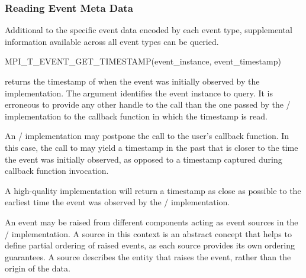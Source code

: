 \subsubsection{Reading Event Meta Data}
\label{sec:tools:mpit:events:metadata}

Additional to the specific event data encoded by each event type,
supplemental information available across all event types can be queried.

\begin{funcdef}{MPI\_T\_EVENT\_GET\_TIMESTAMP}{(\mbox{event\_instance}, \mbox{event\_timestamp})}
\end{funcdef}

 returns the timestamp of when the
event was initially observed by the implementation.  The
 argument identifies the event instance to
query. It is erroneous to provide any other handle to the call than the one
passed by the \MPI/ implementation to the callback function in which the
timestamp is read.

\begin{users}
    An \MPI/ implementation may postpone the call to the user's callback
    function.  In this case, the call to
     may yield a timestamp in the
    past that is closer to the time the event was initially observed, as
    opposed to a timestamp captured during callback function invocation.
\end{users}

\begin{implementors}
    A high-quality implementation will return a timestamp as close as possible
    to the earliest time the event was observed by the \MPI/ implementation.
\end{implementors}

An event may be raised from different components acting as event sources in
the \MPI/ implementation.  A source in this context is an abstract concept
that helps to define partial ordering of raised events, as each source
provides its own ordering guarantees. A source describes the entity that
raises the event, rather than the origin of the data.

